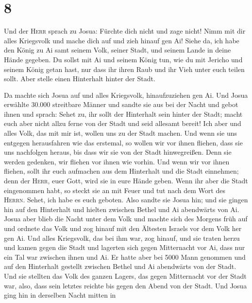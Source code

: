 \hypertarget{section-7}{%
\section{8}\label{section-7}}

 Und der \textsc{Herr} sprach zu Josua: Fürchte dich nicht
und zage nicht! Nimm mit dir alles Kriegsvolk und mache dich auf und
zieh hinauf gen Ai! Siehe da, ich habe den König zu Ai samt seinem Volk,
seiner Stadt, und seinem Lande in deine Hände gegeben.  Du
sollst mit Ai und seinem König tun, wie du mit Jericho und seinem König
getan hast, nur dass ihr ihren Raub und ihr Vieh unter euch teilen
sollt. Aber stelle einen Hinterhalt hinter der Stadt.

 Da machte sich Josua auf und alles Kriegsvolk,
hinaufzuziehen gen Ai. Und Josua erwählte 30.000 streitbare Männer und
sandte sie aus bei der Nacht  und gebot ihnen und sprach:
Sehet zu, ihr sollt der Hinterhalt sein hinter der Stadt; macht euch
aber nicht allzu ferne von der Stadt und seid allesamt bereit!
 Ich aber und alles Volk, das mit mir ist, wollen uns zu
der Stadt machen. Und wenn sie uns entgegen herausfahren wie das
erstemal, so wollen wir vor ihnen fliehen,  dass sie uns
nachfolgen heraus, bis dass wir sie von der Stadt hinwegreißen. Denn sie
werden gedenken, wir fliehen vor ihnen wie vorhin. Und wenn wir vor
ihnen fliehen,  sollt ihr euch aufmachen aus dem
Hinterhalt und die Stadt einnehmen; denn der \textsc{Herr}, euer Gott,
wird sie in eure Hände geben.  Wenn ihr aber die Stadt
eingenommen habt, so steckt sie an mit Feuer und tut nach dem Wort des
\textsc{Herrn}. Sehet, ich habe es euch geboten.  Also
sandte sie Josua hin; und sie gingen hin auf den Hinterhalt und hielten
zwischen Bethel und Ai abendwärts von Ai. Josua aber blieb die Nacht
unter dem Volk  und machte sich des Morgens früh auf und
ordnete das Volk und zog hinauf mit den Ältesten Israels vor dem Volk
her gen Ai.  Und alles Kriegsvolk, das bei ihm war, zog
hinauf, und sie traten herzu und kamen gegen die Stadt und lagerten sich
gegen Mitternacht vor Ai, dass nur ein Tal war zwischen ihnen und Ai.
 Er hatte aber bei 5000 Mann genommen und auf den
Hinterhalt gestellt zwischen Bethel und Ai abendwärts von der Stadt.
 Und sie stellten das Volk des ganzen Lagers, das gegen
Mitternacht vor der Stadt war, also, dass sein letztes reichte bis gegen
den Abend von der Stadt. Und Josua ging hin in derselben Nacht mitten in

